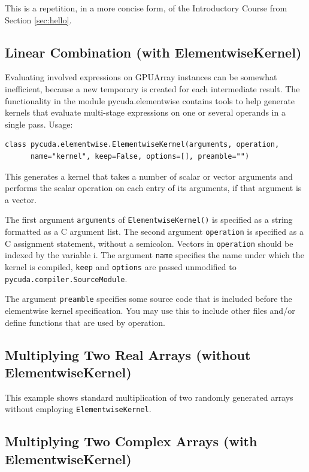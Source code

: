 \documentclass[article,A4,12pt]{llncs}
\begin{document}
This is a repetition, in a more concise form, of the Introductory Course
from Section \ref{sec:hello}.

\subsection{Linear Combination (with ElementwiseKernel)}

Evaluating involved expressions on GPUArray instances can be somewhat inefficient, because a new temporary is created for each intermediate result. The functionality in the module pycuda.elementwise contains tools to help generate kernels that evaluate multi-stage expressions on one or several operands in a single pass. Usage:

\begin{verbatim}
class pycuda.elementwise.ElementwiseKernel(arguments, operation, 
      name="kernel", keep=False, options=[], preamble="")
\end{verbatim}
This generates a kernel that takes a number of scalar or vector arguments and performs the scalar operation on each entry of its arguments, if that argument is a vector.

The first argument {\tt arguments} of {\tt ElementwiseKernel()} is specified as a string formatted as 
a C argument list. The second argument {\tt operation} is specified as a C assignment statement, 
without a semicolon. Vectors in {\tt operation} should be indexed by the variable i. The argument 
{\tt name} specifies the name under which the kernel is compiled, {\tt keep} and {\tt options} 
are passed unmodified to {\tt pycuda.compiler.SourceModule}.

The argument {\tt preamble} specifies some source code that is included before the elementwise 
kernel specification. You may use this to include other files and/or define functions that 
are used by operation.

\subsection{Multiplying Two Real Arrays (without ElementwiseKernel)}

This example shows standard multiplication of two randomly generated 
arrays without employing {\tt ElementwiseKernel}. 

\subsection{Multiplying Two Complex Arrays (with ElementwiseKernel)}
\end{document}

